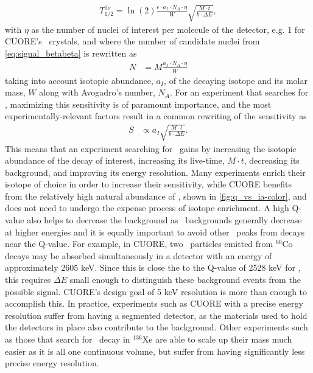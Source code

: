 \begin{align}
    T^{0\nu}_{1/2}=\ln(2)\frac{\epsilon \cdot a_I \cdot N_A \cdot \eta}{W} \sqrt{\frac{M\cdot t}{b\cdot \Delta E}},
    \label{eq:sensitivity_long}
\end{align}
with $\eta$ as the number of nuclei of interest per molecule of the detector, e.g. 1 for CUORE's \teotwo~crystals, and where the number of candidate nuclei from \autoref{eq:signal_betabeta} is rewritten as
\begin{align}
    N &=M\frac{a_I \cdot N_A\cdot \eta}{W}
\end{align}
taking into account isotopic abundance, $a_I$, of the decaying isotope and its molar mass, $W$ along with Avogadro's number, $N_A$.
For an experiment that searches for \zeronubb, maximizing this sensitivity is of paramount importance, and the most experimentally-relevant factors result in a common rewriting of the sensitivity as
\begin{align}
S &\propto a_I \sqrt{\frac{M \cdot t}{b \cdot \Delta E}}.
\label{eq:sensitivity_short}
\end{align}
This means that an experiment searching for \zeronubb~gains by increasing the isotopic abundance of the decay of interest, increasing its live-time, $M\cdot t$, decreasing its background, and improving its energy resolution.
Many experiments enrich their isotope of choice in order to increase their sensitivity, while CUORE benefits from the relatively high natural abundance of \teonethirty, shown in \autoref{fig:q_vs_ia-color}, and does not need to undergo the expense process of isotope enrichment.
A high Q-value also helps to decrease the background as \gamma~backgrounds generally decrease at higher energies and it is equally important to avoid other \gamma~peaks from decays near the Q-value.
For example, in CUORE, two \gamma~particles emitted from $^{60}\textrm{Co}$ decays may be absorbed simultaneously in a detector with an energy of approximately 2605 keV.
Since this is close the to the Q-value of 2528 keV for \teonethirty, this requires $\Delta E$ small enough to distinguish these background events from the possible signal.
CUORE's design goal of 5 keV resolution is more than enough to accomplish this.
In practice, experiments such as CUORE with a precise energy resolution suffer from having a segmented detector, as the materials used to hold the detectors in place also contribute to the background.
Other experiments such as those that search for \zeronubb~decay in $^{136}$Xe are able to scale up their mass much easier as it is all one continuous volume, but suffer from having significantly less precise energy resolution.
